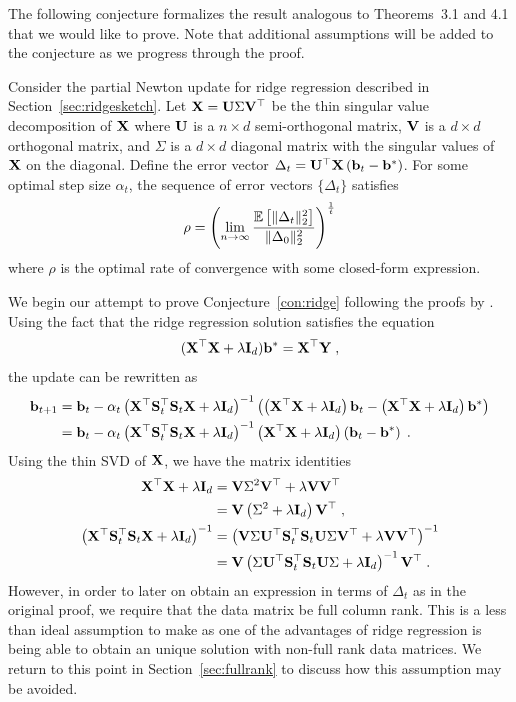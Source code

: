 The following conjecture formalizes the result analogous to Theorems~3.1 and 4.1 that we would like to prove. Note that additional assumptions will be added to the conjecture as we progress through the proof.

\begin{conjecture} \label{con:ridge}
Consider the partial Newton update for ridge regression described in Section~\ref{sec:ridgesketch}. Let $\mathbf{X} = \mathbf{U}\Sigma\mathbf{V}^\top$ be the thin singular value decomposition of $\mathbf{X}$ where $\mathbf{U}$ is a $n\times d$ semi-orthogonal matrix, $\mathbf{V}$ is a $d\times d$ orthogonal matrix, and $\Sigma$ is a $d\times d$ diagonal matrix with the singular values of $\mathbf{X}$ on the diagonal. Define the error vector $\Delta_t=\mathbf{U}^\top\mathbf{X}\left(\mathbf{b}_t-\mathbf{b}^*\right)$. For some optimal step size $\alpha_t$, the sequence of error vectors $\{\Delta_t\}$ satisfies
\[
\rho = \left(\lim_{n\rightarrow\infty}\frac{\mathbb{E}\left[\|\Delta_t\|_2^2\right]}{\|\Delta_0\|_2^2}\right)^\frac{1}{t}
\]
where $\rho$ is the optimal rate of convergence with some closed-form expression.
\end{conjecture}

We begin our attempt to prove Conjecture~\ref{con:ridge} following the proofs by \citet{Lacotte:2020}. Using the fact that the ridge regression solution satisfies the equation
\[
(\mathbf{X}^\top\mathbf{X} + \lambda\mathbf{I}_d)\mathbf{b}^* = \mathbf{X}^\top\mathbf{Y} \;,
\]
the update can be rewritten as
\begin{align*}
\mathbf{b}_{t+1} &= \mathbf{b}_t - \alpha_t\left(\mathbf{X}^\top\mathbf{S}_t^\top\mathbf{S}_t\mathbf{X} + \lambda\mathbf{I}_d\right)^{-1}\left(\left(\mathbf{X}^\top\mathbf{X}+\lambda\mathbf{I}_d\right)\mathbf{b}_t-\left(\mathbf{X}^\top\mathbf{X}+\lambda\mathbf{I}_d\right)\mathbf{b}^*\right) \\
&= \mathbf{b}_t - \alpha_t\left(\mathbf{X}^\top\mathbf{S}_t^\top\mathbf{S}_t\mathbf{X} + \lambda\mathbf{I}_d\right)^{-1}\left(\mathbf{X}^\top\mathbf{X}+\lambda\mathbf{I}_d\right)\left(\mathbf{b}_t-\mathbf{b}^*\right) \;.
\end{align*}
Using the thin SVD of $\mathbf{X}$, we have the matrix identities
\begin{align*}
\mathbf{X}^\top\mathbf{X}+\lambda\mathbf{I}_d &= \mathbf{V}\Sigma^2\mathbf{V}^\top + \lambda \mathbf{V}\mathbf{V}^\top \\
&= \mathbf{V}\left(\Sigma^2+ \lambda\mathbf{I}_d\right)\mathbf{V}^\top \;, \\
\left(\mathbf{X}^\top\mathbf{S}_t^\top\mathbf{S}_t\mathbf{X} + \lambda\mathbf{I}_d\right)^{-1} &= \left(\mathbf{V}\Sigma\mathbf{U}^\top\mathbf{S}_t^\top\mathbf{S}_t\mathbf{U}\Sigma\mathbf{V}^\top + \lambda\mathbf{V}\mathbf{V}^\top\right)^{-1} \\
&= \mathbf{V}\left(\Sigma\mathbf{U}^\top\mathbf{S}_t^\top\mathbf{S}_t\mathbf{U}\Sigma + \lambda\mathbf{I}_d\right)^{-1}\mathbf{V}^\top \;.
\end{align*}
However, in order to later on obtain an expression in terms of $\Delta_t$ as in the original proof, we require that the data matrix be full column rank. This is a less than ideal assumption to make as one of the advantages of ridge regression is being able to obtain an unique solution with non-full rank data matrices. We return to this point in Section~\ref{sec:fullrank} to discuss how this assumption may be avoided.

